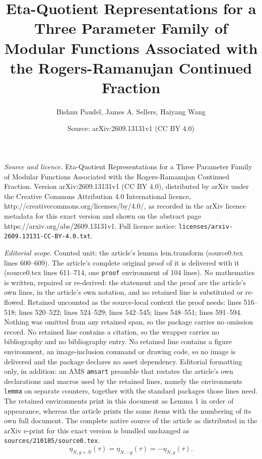 \documentclass[10pt,a4paper]{amsart}
\title{Eta-Quotient Representations for a Three Parameter Family of Modular Functions Associated with the Rogers-Ramanujan Continued Fraction}
\author{Bishnu Paudel, James A. Sellers, Haiyang Wang}
\date{Source: arXiv:2609.13131v1 (CC BY 4.0)}
\begin{document}
\maketitle

\noindent\emph{Source and licence.} Eta-Quotient Representations for a Three Parameter Family of Modular Functions Associated with the Rogers-Ramanujan Continued Fraction. Version arXiv:2609.13131v1 (CC BY 4.0), distributed by arXiv under the Creative Commons Attribution 4.0 International licence, http://creativecommons.org/licenses/by/4.0/, as recorded in the arXiv licence metadata for this exact version and shown on the abstract page https://arxiv.org/abs/2609.13131v1. Full licence notice: \texttt{licenses/arxiv-2609.13131-CC-BY-4.0.txt}.\par\smallskip

\noindent\textit{Editorial scope.} Counted unit: the article's lemma lem.transform (source0.tex lines 600--609). The article's complete original proof of it is delivered with it (source0.tex lines 611--714, one \texttt{proof} environment of 104 lines). No mathematics is written, repaired or re-derived: the statement and the proof are the article's own lines, in the article's own notation, and no retained line is substituted or re-flowed.  Retained uncounted as the source-local context the proof needs: lines 516--518; lines 520--522; lines 524--529; lines 542--545; lines 548--551; lines 591--594.  Nothing was omitted from any retained span, so the package carries no omission record.  No retained line contains a citation, so the wrapper carries no bibliography and no bibliography entry.  No retained line contains a figure environment, an image-inclusion command or drawing code, so no image is delivered and the package declares no asset dependency.  Editorial formatting only, in addition: an AMS \texttt{amsart} preamble that restates the article's own declarations and macros used by the retained lines, namely the environments \texttt{lemma} on separate counters, together with the standard packages those lines need.  The retained environments print in this document as Lemma 1 in order of appearance, whereas the article prints the same items with the numbering of its own full document.  The complete native source of the article as distributed in the arXiv e-print for this exact version is bundled unchanged as \texttt{sources/210185/source0.tex}.
\begin{equation}\label{eq.Nshift}
\eta_{N,g+N}(\tau)=\eta_{N,-g}(\tau)=-\eta_{N,g}(\tau).
\end{equation}
\end{document}
